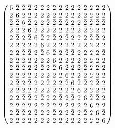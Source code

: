\documentclass{beamer}
\begin{document}
\begin{frame}

  \[
    \arraycolsep=2.0pt\def\arraystretch{0.75}
    \left(
      \begin{array}{cccccccccccccccc}
        6&\bar{2}&\bar{2}&\bar{2}&2&2&2&2&2&2&2&2&2&2&2&2\\
        \bar{2}&6&\bar{2}&\bar{2}&\bar{2}&\bar{2}&2&2&\bar{2}&\bar{2}&\bar{2}&\bar{2}&2&2&\bar{2}&\bar{2}\\
        \bar{2}&\bar{2}&6&\bar{2}&2&2&\bar{2}&\bar{2}&\bar{2}&\bar{2}&2&2&\bar{2}&\bar{2}&\bar{2}&\bar{2}\\
        \bar{2}&\bar{2}&\bar{2}&6&\bar{2}&\bar{2}&\bar{2}&\bar{2}&2&2&\bar{2}&\bar{2}&\bar{2}&\bar{2}&2&2\\
        2&\bar{2}&2&\bar{2}&6&\bar{2}&2&\bar{2}&2&\bar{2}&2&2&2&\bar{2}&\bar{2}&2\\
        2&\bar{2}&2&\bar{2}&\bar{2}&6&\bar{2}&2&\bar{2}&2&2&2&\bar{2}&2&2&\bar{2}\\
        2&2&\bar{2}&\bar{2}&2&\bar{2}&6&\bar{2}&2&\bar{2}&\bar{2}&2&2&2&2&\bar{2}\\
        2&2&\bar{2}&\bar{2}&\bar{2}&2&\bar{2}&6&\bar{2}&2&2&\bar{2}&2&2&\bar{2}&2\\
        2&\bar{2}&\bar{2}&2&2&\bar{2}&2&\bar{2}&6&\bar{2}&2&\bar{2}&\bar{2}&2&2&2\\
        2&\bar{2}&\bar{2}&2&\bar{2}&2&\bar{2}&2&\bar{2}&6&\bar{2}&2&2&\bar{2}&2&2\\
        2&\bar{2}&2&\bar{2}&2&2&\bar{2}&2&2&\bar{2}&6&\bar{2}&\bar{2}&2&\bar{2}&2\\
        2&\bar{2}&2&\bar{2}&2&2&2&\bar{2}&\bar{2}&2&\bar{2}&6&2&\bar{2}&2&\bar{2}\\
        2&2&\bar{2}&\bar{2}&2&\bar{2}&2&2&\bar{2}&2&\bar{2}&2&6&\bar{2}&\bar{2}&2\\
        2&2&\bar{2}&\bar{2}&\bar{2}&2&2&2&2&\bar{2}&2&\bar{2}&\bar{2}&6&2&\bar{2}\\
        2&\bar{2}&\bar{2}&2&\bar{2}&2&2&\bar{2}&2&2&\bar{2}&2&\bar{2}&2&6&\bar{2}\\
        2&\bar{2}&\bar{2}&2&2&\bar{2}&\bar{2}&2&2&2&2&\bar{2}&2&\bar{2}&\bar{2}&6\\
      \end{array}
    \right)
  \]
 
\end{frame}
\end{document}
